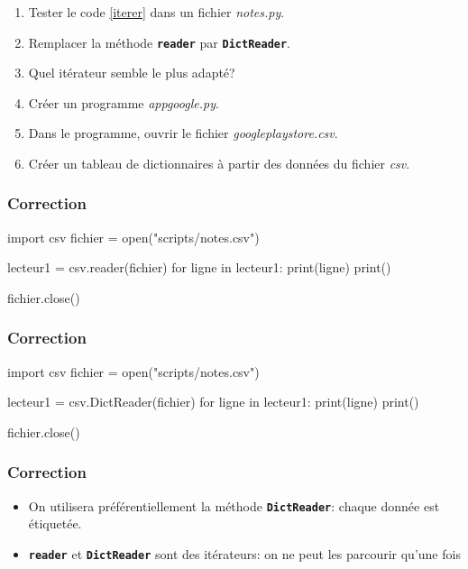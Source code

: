 \documentclass[svgnames,11pt]{beamer}
\begin{document}
\begin{frame}
    \frametitle{}

    \begin{activite}
        \begin{enumerate}
            \item Tester le code \ref{iterer} dans un fichier \emph{notes.py}.
            \item Remplacer la méthode \textbf{\texttt{reader}} par \textbf{\texttt{DictReader}}.
            \item Quel itérateur semble le plus adapté?
            \item Créer un programme \emph{appgoogle.py}.
            \item Dans le programme, ouvrir le fichier \emph{googleplaystore.csv}.
            \item Créer un tableau de dictionnaires à partir des données du fichier \emph{csv}.
        \end{enumerate}
    \end{activite}


\end{frame}
\begin{frame}[fragile]
    \frametitle{Correction}
    
    \begin{pycode}
import csv
fichier = open("scripts/notes.csv")

lecteur1 = csv.reader(fichier)
for ligne in lecteur1:
    print(ligne)
    print()

fichier.close()
    \end{pycode}

\end{frame}
\begin{frame}[fragile]
    \frametitle{Correction}
    
    \begin{pycode}
import csv
fichier = open("scripts/notes.csv")

lecteur1 = csv.DictReader(fichier)
for ligne in lecteur1:
    print(ligne)
    print()

fichier.close()
    \end{pycode}
\end{frame}
\begin{frame}
    \frametitle{Correction}

    \begin{itemize}
        \item On utilisera préférentiellement la méthode \textbf{\texttt{DictReader}}: chaque donnée est étiquetée.
        \item \texttt{\textbf{reader}} et \texttt{\textbf{DictReader}} sont des itérateurs: on ne peut les parcourir qu'une fois
    \end{itemize}

\end{frame}
\end{document}
